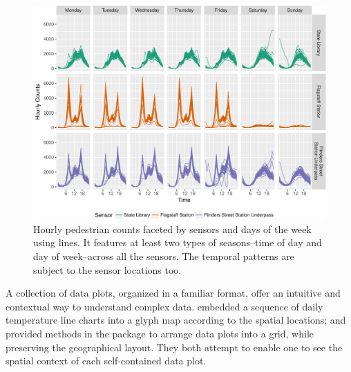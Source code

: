 \documentclass[article]{jss}
\theoremstyle{definition}
\theoremstyle{definition}
\theoremstyle{remark}
\begin{document}
\begin{CodeChunk}
\begin{figure}

{\centering \includegraphics[width=\textwidth]{figure/facet-time-1} 

}

\caption[Hourly pedestrian counts faceted by sensors and
days of the week using lines. It features at least two types of
seasons--time of day and day of week--across all the sensors. The
temporal patterns are subject to the sensor locations too.]{Hourly pedestrian counts faceted by sensors and
days of the week using lines. It features at least two types of
seasons--time of day and day of week--across all the sensors. The
temporal patterns are subject to the sensor locations too.}\label{fig:facet-time}
\end{figure}
\end{CodeChunk}






A collection of data plots, organized in a familiar format, offer an
intuitive and contextual way to understand complex data.
\citet{Wickham2012glyph} embedded a sequence of daily temperature line
charts into a glyph map according to the spatial locations; and
\citet{R-geofacet} provided methods in the  package to
arrange data plots into a grid, while preserving the geographical
layout. They both attempt to enable one to see the spatial context of
each self-contained data plot.
\end{document}
